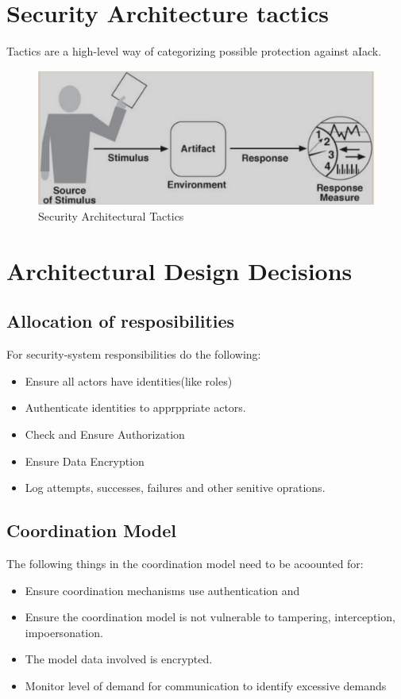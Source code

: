 \documentclass[a4paper]{report}
\begin{document}
\section{Security Architecture tactics}
Tactics are a high-level way of categorizing possible protection against aIack.
\begin{figure}[h]
\centering 
\includegraphics[scale=0.3]{aimages/genreralqascenario.png}
\caption{\label{tab:widgets}Security Architectural Tactics}
\end{figure}

\section{Architectural Design Decisions}
\subsection{Allocation of resposibilities}
For security-system responsibilities do the following:
\begin{itemize}
\item Ensure all actors have identities(like roles)
\item Authenticate identities to apprppriate actors.
\item Check and Ensure Authorization
\item Ensure Data Encryption
\item Log attempts, successes, failures and other senitive oprations.
\end{itemize}
\subsection{Coordination Model}
The following things in the coordination model need to be acoounted for:
\begin{itemize}
\item Ensure coordination mechanisms use authentication and 
\item Ensure the coordination model is not vulnerable to tampering, interception, impoersonation.
\item The model data involved is encrypted.
\item Monitor level of demand for communication to identify excessive demands
\end{itemize}
\end{document}
